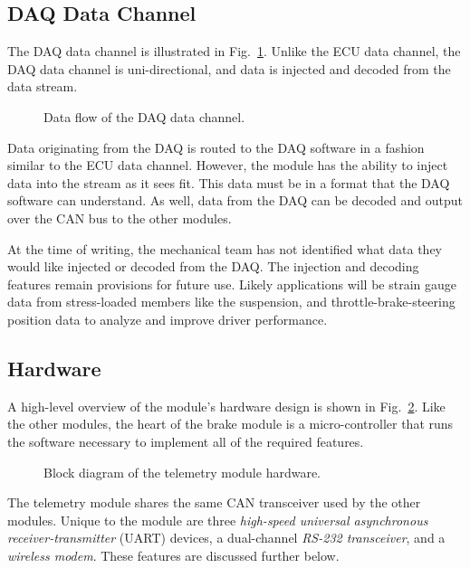 \subsection{DAQ Data Channel}

The DAQ data channel is illustrated in Fig.\ \ref{fig:dac_data_channel}. Unlike the ECU data channel, the DAQ data channel is uni-directional, and data is injected and decoded from the data stream.

\begin{figure}[H]
	\centering
	
	\caption{Data flow of the DAQ data channel.}
	\label{fig:dac_data_channel}
\end{figure}

Data originating from the DAQ is routed to the DAQ software in a fashion similar to the ECU data channel. However, the module has the ability to inject data into the stream as it sees fit. This data must be in a format that the DAQ software can understand. As well, data from the DAQ can be decoded and output over the CAN bus to the other modules. 

At the time of writing, the mechanical team has not identified what data they would like injected or decoded from the DAQ. The injection and decoding features remain provisions for future use. Likely applications will be strain gauge data from stress-loaded members like the suspension, and throttle-brake-steering position data to analyze and improve driver performance.

\subsection{Hardware}

A high-level overview of the module's hardware design is shown in Fig.\ \ref{fig:design_telemetry_hardware_block}. Like the other modules, the heart of the brake module is a micro-controller that runs the software necessary to implement all of the required features. 

\begin{figure}[H]
\centering

\caption{Block diagram of the telemetry module hardware.}
\label{fig:design_telemetry_hardware_block}
\end{figure}


The telemetry module shares the same CAN transceiver used by the other modules. Unique to the module are three \emph{high-speed universal asynchronous receiver-transmitter} (UART) devices, a dual-channel \emph{RS-232 transceiver}, and a \emph{wireless modem}. These features are discussed further below.

